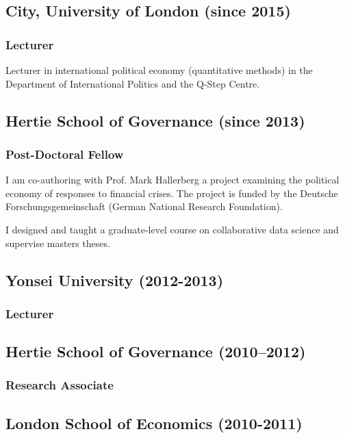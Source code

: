 \documentclass[a4paper]{article}
\begin{document}
\subsection*{City, University of London (since 2015)}

\subsubsection*{Lecturer}

Lecturer in international political economy (quantitative methods) in the Department of International Politics and the Q-Step Centre.

\subsection*{Hertie School of Governance (since 2013)}

\subsubsection*{Post-Doctoral Fellow}

I am co-authoring with Prof. Mark Hallerberg a project examining the political economy of responses to financial crises. The project is funded by the Deutsche Forschungsgemeinschaft (German National Research Foundation).\vspace{0.25cm}

\noindent I designed and taught a graduate-level course on collaborative data science and supervise masters theses.

\subsection*{Yonsei University (2012-2013)}
\subsubsection*{Lecturer}

\subsection*{Hertie School of Governance (2010--2012)}
\subsubsection*{Research Associate}

\subsection*{London School of Economics (2010-2011)}
\end{document}
